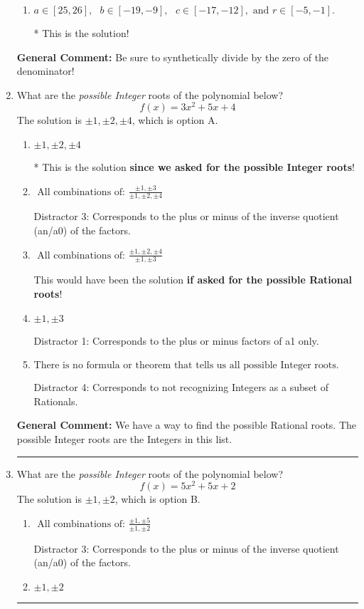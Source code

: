 \documentclass{extbook}[14pt]
\newcommand{\litem}[1]{\item #1

\rule{\textwidth}{0.4pt}}
\begin{document}
\begin{enumerate}
{\begin{enumerate}[label=\Alph*.]
 You multiplied by the synthetic number and subtracted rather than adding during synthetic division.
\item \( a \in [25, 26], \text{   } b \in [-19, -9], \text{   } c \in [-17, -12], \text{   and   } r \in [-5, -1]. \)

* This is the solution!
\end{enumerate}

\textbf{General Comment:} Be sure to synthetically divide by the zero of the denominator!
}
\litem{
What are the \textit{possible Integer} roots of the polynomial below?
\[ f(x) = 3x^{2} +5 x + 4 \]The solution is \( \pm 1,\pm 2,\pm 4 \), which is option A.\begin{enumerate}[label=\Alph*.]
\item \( \pm 1,\pm 2,\pm 4 \)

* This is the solution \textbf{since we asked for the possible Integer roots}!
\item \( \text{ All combinations of: }\frac{\pm 1,\pm 3}{\pm 1,\pm 2,\pm 4} \)

 Distractor 3: Corresponds to the plus or minus of the inverse quotient (an/a0) of the factors. 
\item \( \text{ All combinations of: }\frac{\pm 1,\pm 2,\pm 4}{\pm 1,\pm 3} \)

This would have been the solution \textbf{if asked for the possible Rational roots}!
\item \( \pm 1,\pm 3 \)

 Distractor 1: Corresponds to the plus or minus factors of a1 only.
\item \( \text{There is no formula or theorem that tells us all possible Integer roots.} \)

 Distractor 4: Corresponds to not recognizing Integers as a subset of Rationals.
\end{enumerate}

\textbf{General Comment:} We have a way to find the possible Rational roots. The possible Integer roots are the Integers in this list.
}
\litem{
What are the \textit{possible Integer} roots of the polynomial below?
\[ f(x) = 5x^{2} +5 x + 2 \]The solution is \( \pm 1,\pm 2 \), which is option B.\begin{enumerate}[label=\Alph*.]
\item \( \text{ All combinations of: }\frac{\pm 1,\pm 5}{\pm 1,\pm 2} \)

 Distractor 3: Corresponds to the plus or minus of the inverse quotient (an/a0) of the factors. 
\item \( \pm 1,\pm 2 \)


\end{enumerate}}
\end{enumerate}
\end{document}
